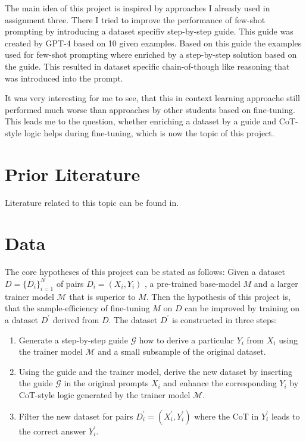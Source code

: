 \documentclass[11pt]{article}
\begin{document}
    The main idea of this project is inspired by approaches I already used in assignment three.
    There I tried to improve the performance of few-shot prompting by introducing a dataset specifiv step-by-step guide.
    This guide was created by GPT-4 based on 10 given examples.
    Based on this guide the examples used for few-shot prompting where enriched by a step-by-step solution based on the guide.
    This resulted in dataset specific chain-of-though like reasoning that was introduced into the prompt.

    It was very interesting for me to see, that this in context learning approache still performed much worse than
    approaches by other students based on fine-tuning.
    This leads me to the question, whether enriching a dataset by a guide and CoT-style logic helps during fine-tuning,
    which is now the topic of this project.


    \section{Prior Literature}
    Literature related to this topic can be found in\cite{chen_learning_2023, chen_fireact_2023}.


    \section{Data}\label{sec:data}

    The core hypotheses of this project can be stated as follows:
    Given a dataset $D = \{D_i\}_{i=1}^N$ of pairs $D_i = (X_i, Y_i)$ , a pre-trained base-model $M$ and
    a larger trainer model $\mathcal{M}$ that is superior to $M$.
    Then the hypothesis of this project is, that the sample-efficiency of fine-tuning $M$ on $D$ can be improved by
    training on a dataset $D^\prime$ derived from $D$.
    The dataset $D^\prime$ is constructed in three steps:
    \begin{enumerate}
        \item Generate a step-by-step guide $\mathcal{G}$ how to derive a particular $Y_i$ from $X_i$ using the trainer model
        $\mathcal{M}$ and a small subsample of the original dataset.
        \item Using the guide and the trainer model, derive the new dataset by inserting the guide $\mathcal{G}$ in the
        original prompts $X_i$ and enhance the corresponding $Y_i$ by CoT-style logic generated by the trainer model $\mathcal{M}$.
        \item Filter the new dataset for pairs $D^\prime_i = (X^\prime_i, Y^\prime_i)$ where the CoT in $Y^\prime_i$
        leads to the correct answer $Y^\prime_i$.
    \end{enumerate}
\end{document}

